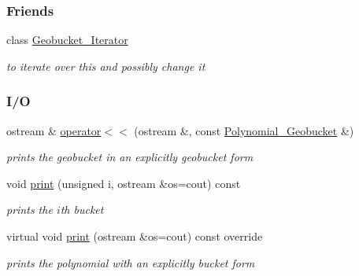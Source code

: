 \subsubsection*{Friends}
\begin{DoxyCompactItemize}
\item 
\mbox{\label{group__polygroup_a45580077827a8fdbd6d2fabdbb2a2d7f}} 
class \hyperlink{group__polygroup_a45580077827a8fdbd6d2fabdbb2a2d7f}{Geobucket\+\_\+\+Iterator}
\begin{DoxyCompactList}\small\item\em to iterate over {\ttfamily this} and possibly change it \end{DoxyCompactList}\end{DoxyCompactItemize}
\subsubsection*{I/O}
\begin{DoxyCompactItemize}
\item 
ostream \& \hyperlink{group__polygroup_af97062198c6ade3e8d3077308e89669d}{operator$<$$<$} (ostream \&, const \hyperlink{group__polygroup_class_polynomial___geobucket}{Polynomial\+\_\+\+Geobucket} \&)
\begin{DoxyCompactList}\small\item\em prints the geobucket in an explicitly geobucket form \end{DoxyCompactList}\item 
void \hyperlink{group__polygroup_a672dd35e16935aaa5d5334283eab918e}{print} (unsigned i, ostream \&os=cout) const
\begin{DoxyCompactList}\small\item\em prints the $i$th bucket \end{DoxyCompactList}\item 
virtual void \hyperlink{group__polygroup_a3c8cb0c53e9acf4d60345fb4b4dbb807}{print} (ostream \&os=cout) const override
\begin{DoxyCompactList}\small\item\em prints the polynomial with an explicitly bucket form \end{DoxyCompactList}\end{DoxyCompactItemize}


